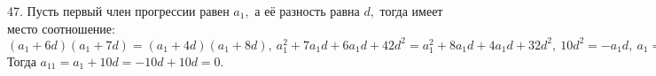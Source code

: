 47. Пусть первый член прогрессии равен $a_1,$ а её разность равна $d,$ тогда имеет место соотношение:
$(a_1+6d)(a_1+7d)=(a_1+4d)(a_1+8d),\ a_1^2+7a_1d+6a_1d+42d^2=a_1^2+8a_1d+4a_1d+32d^2,\ 10d^2=-a_1d,\ a_1=-10d.$ Тогда $a_{11}=a_1+10d=-10d+10d=0.$\\
